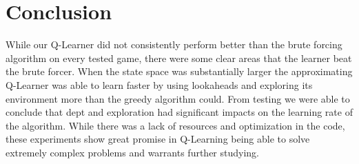 \section{Conclusion}
While our Q-Learner did not consistently perform better than the brute forcing
algorithm on every tested game, there were some clear areas that the learner
beat the brute forcer. When the state space was substantially larger the 
approximating Q-Learner was able to learn faster by using lookaheads and 
exploring its environment more than the greedy algorithm could. From testing
we were able to conclude that dept and exploration had significant impacts on the
learning rate of the algorithm. While there was a lack of resources and 
optimization in the code, these experiments show great promise in Q-Learning
being able to solve extremely complex problems and warrants further studying.

